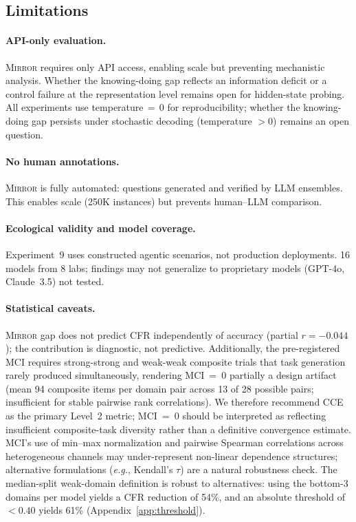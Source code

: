 \documentclass[10pt]{article}
\newcommand{\mirror}{\textsc{Mirror}}
\newcommand{\MCI}{MCI}
\newcommand{\CCE}{CCE}
\newcommand{\CFR}{CFR}
\newcommand{\eg}{\textit{e.g.}}
\begin{document}
\subsection{Limitations}

\paragraph{API-only evaluation.}
\mirror{} requires only API access, enabling scale but preventing mechanistic
analysis. Whether the knowing-doing gap reflects an information deficit or a
control failure at the representation level remains open for hidden-state probing.
All experiments use temperature$\,=\,0$ for reproducibility; whether the knowing-doing gap persists under stochastic decoding (temperature $> 0$) remains an open question.

\paragraph{No human annotations.}
\mirror{} is fully automated: questions generated and verified by LLM ensembles.
This enables scale (250K instances) but prevents human--LLM comparison.

\paragraph{Ecological validity and model coverage.}
Experiment~9 uses constructed agentic scenarios, not production deployments. 16 models from 8 labs; findings may not generalize to proprietary models (GPT-4o, Claude~3.5) not tested.

\paragraph{Statistical caveats.}
\mirror{} gap does not predict \CFR{} independently of accuracy (partial $r = -0.044$); the contribution is diagnostic, not predictive. Additionally, the pre-registered \MCI{} requires strong-strong and weak-weak composite trials that task generation rarely produced simultaneously, rendering \MCI{}~=~0 partially a design artifact (mean 94 composite items per domain pair across 13 of 28 possible pairs; insufficient for stable pairwise rank correlations). We therefore recommend \CCE{} as the primary Level~2 metric; \MCI{}~=~0 should be interpreted as reflecting insufficient composite-task diversity rather than a definitive convergence estimate.
MCI's use of min--max normalization and pairwise Spearman correlations across
heterogeneous channels may under-represent non-linear dependence structures;
alternative formulations (\eg, Kendall's $\tau$) are a natural robustness check.
The median-split weak-domain definition is robust to alternatives: using the
bottom-3 domains per model yields a CFR reduction of 54\%, and an absolute
threshold of $<0.40$ yields 61\% (Appendix~\ref{app:threshold}).
\end{document}
